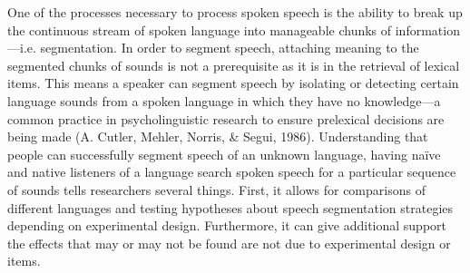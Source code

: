 One of the processes necessary to process spoken speech is the ability to break up the continuous stream of spoken language into manageable chunks of information—i.e. segmentation. In order to segment speech, attaching meaning to the segmented chunks of sounds is not a prerequisite as it is in the retrieval of lexical items. This means a speaker can segment speech by isolating or detecting certain language sounds from a spoken language in which they have no knowledge—a common practice in psycholinguistic research to ensure prelexical decisions are being made (A. Cutler, Mehler, Norris, \& Segui, 1986). Understanding that people can successfully segment speech of an unknown language, having naïve and native listeners of a language search spoken speech for a particular sequence of sounds tells researchers several things. First, it allows for comparisons of different languages and testing hypotheses about speech segmentation strategies depending on experimental design. Furthermore, it can give additional support the effects that may or may not be found are not due to experimental design or items.
